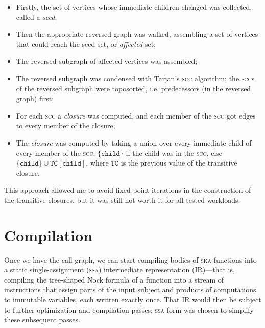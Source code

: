 \documentclass[twoside]{article}
\begin{document}
\begin{itemize}
  \item  Firstly, the set of vertices whose immediate children changed was collected, called a \emph{seed};
  \item  Then the appropriate reversed graph was walked, assembling a set of vertices that could reach the seed set, or \emph{affected} set;
  \item  The reversed subgraph of affected vertices was assembled;
  \item  The reversed subgraph was condensed with Tarjan's \textsc{scc} algorithm; the \textsc{scc}s of the reversed subgraph were toposorted, i.e. predecessors (in the reversed graph) first;
  \item  For each \textsc{scc} a \emph{closure} was computed, and each member of the \textsc{scc} got edges to every member of the closure;
  \item  The \emph{closure} was computed by taking a union over every immediate child of every member of the \textsc{scc}: $\{\mathtt{child}\}$ if the child was in the \textsc{scc}, else $\{\mathtt{child}\} \cup \mathtt{TC}\left[\mathtt{child}\right]$, where $\mathtt{TC}$ is the previous value of the transitive closure.
\end{itemize}

\noindent
This approach allowed me to avoid fixed-point iterations in the construction of the transitive closures, but it was still not worth it for all tested workloads.

\section{Compilation}

Once we have the call graph, we can start compiling bodies of \textsc{ska}-functions into a static single-assignment (\textsc{ssa}) intermediate representation (IR)---that is, compiling the tree-shaped Nock formula of a function into a stream of instructions that assign parts of the input subject and products of computations to immutable variables, each written exactly once. That IR would then be subject to further optimization and compilation passes; \textsc{ssa} form was chosen to simplify these subsequent passes.
\end{document}
